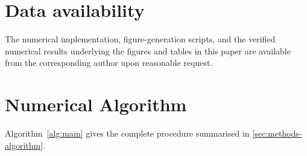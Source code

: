 \documentclass[preprint,12pt,a4paper]{elsarticle}
\theoremstyle{plain}
\theoremstyle{definition}
\theoremstyle{remark}
\begin{document}
\section*{Data availability}

The numerical implementation, figure-generation scripts, and
the verified numerical results underlying the figures and tables in this
paper are available from the corresponding author upon reasonable request.
\appendix

\section{Numerical Algorithm}
\label{app:algorithm}

Algorithm~\ref{alg:main} gives the complete procedure summarised in
\cref{sec:methods-algorithm}.
\end{document}
